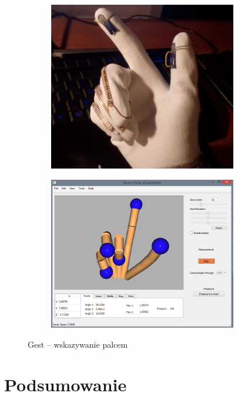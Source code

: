 \documentclass[12pt,a4paper]{article}
\begin{document}
\begin{figure}[!htb]
\centering
	\begin{subfigure}{.47\textwidth}
	\centering
	\includegraphics[width=0.9\textwidth]{./images/Point.jpg}
	\end{subfigure}%
	\begin{subfigure}{.47\textwidth}
	\centering
	\includegraphics[width=0.9\textwidth]{./images/PointQt.png}
	\end{subfigure}
\caption{Gest -- wskazywanie palcem \label{fig:Point}}
\end{figure}

\newpage
\section{Podsumowanie}
\end{document}
